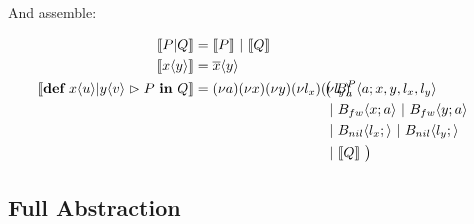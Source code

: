And assemble:

\begin{align*}
  \encMJtoAP{P \jpar Q}
  &= \encMJtoAP{P} \apar \encMJtoAP{Q}
  \\
  \encMJtoAP{\jsnd{x}{y}}
  &= \asnd{x}{y}
  \\
  \encMJtoAP{\jdef{\jrct{\jrcv{x}{u} \jpat \jrcv{y}{v}}{P}}{Q}}
  &=
  \anew{a}{\anew{x}{\anew{y}{\anew{l_x}{\anew{l_y}{
    \hspace{-1cm}&&\big(\ \ains{B_a^P}{a}{x, y, l_x, l_y} \\ %
    &&&\apar \ains{B_{fw}}{x}{a} \apar \ains{B_{fw}}{y}{a} \\
    &&&\apar \ains{B_{nil}}{l_x}{} \apar \ains{B_{nil}}{l_y}{} \\
    &&&\apar \encMJtoAP{Q}\ \big)
  }}}}}
\end{align*}




\subsection{Full Abstraction}

